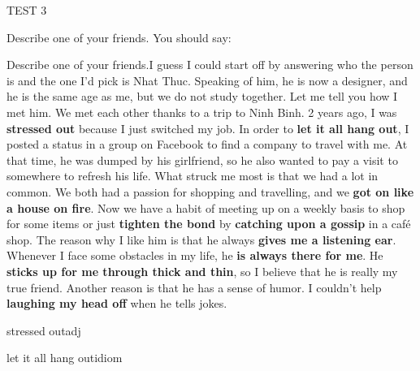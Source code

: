 \begin{glossarymc}[Cambridge 5]
\begin{test}{TEST 3}
\begin{qa}{Describe one of your friends. You should say:}
{        \begin{qa}{Describe one of your friends.}{I guess I could start off by answering who the person is and the one I'd pick is Nhat Thuc. Speaking of him, he is now a designer, and he is the same age as me, but we do not study together. Let me tell you how I met him. We met each other thanks to a trip to Ninh Binh. 2 years ago, I was \textbf{stressed out} because I just switched my job. In order to \textbf{let it all hang out}, I posted a status in a group on Facebook to find a company to travel with me. At that time, he was dumped by his girlfriend, so he also wanted to pay a visit to somewhere to refresh his life. What struck me most is that we had a lot in common. We both had a passion for shopping and travelling, and we \textbf{got on like a house on fire}. Now we have a habit of meeting up on a weekly basis to shop for some items or just \textbf{tighten the bond} by \textbf{catching upon a gossip} in a café shop. The reason why I like him is that he always \textbf{gives me a listening ear}. Whenever I face some obstacles in my life, he \textbf{is always there for me}. He \textbf{sticks up for me through thick and thin}, so I believe that he is really my true friend. Another reason is that he has a sense of humor. I couldn't help \textbf{laughing my head off} when he tells jokes.}
    \end{qa}

        \begin{VocabExplain}[Part 2]
            \begin{ExplainCard}{stressed out}{adj}
            \end{ExplainCard}

            \begin{ExplainCard}{let it all hang out}{idiom}
            \end{ExplainCard}


\end{VocabExplain}}
\end{qa}
\end{test}
\end{glossarymc}
